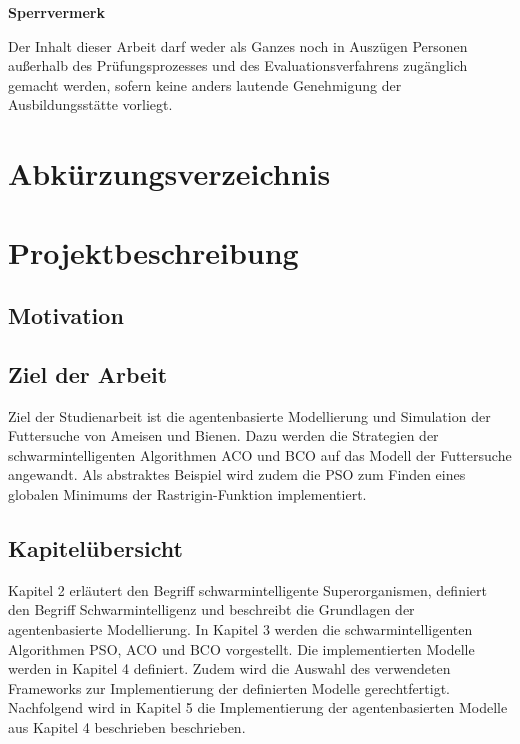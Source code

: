 \documentclass[a4paper, 11pt]{article}
\makeatletter
\newcommand*{\maintoc}{
	\begingroup
	\@fileswfalse
	\renewcommand*{\appendixattoc}{
		\value{tocdepth}=-10000
	}
	\tableofcontents
	\endgroup
}
\newcommand*{\appendixattoc}{
}
\makeatother
\begin{document}
\newpage
\begin{framed}
	\begin{center}
		\Large\bfseries Sperrvermerk
	\end{center}
	\medskip
	\noindent
	Der Inhalt dieser Arbeit darf weder als Ganzes noch in Auszügen Personen
	außerhalb des Prüfungsprozesses und des Evaluationsverfahrens zugänglich gemacht
	werden, sofern keine anders lautende Genehmigung der Ausbildungsstätte vorliegt.
\end{framed}
\newpage
{}
\renewcommand{\abstractname}{Zusammenfassung}
\begin{abstract}
\end{abstract}
\newpage
\maintoc           %
\newpage
\listoffigures             %
\newpage
\listoftables              %
\newpage
\section*{\Large \textbf Abkürzungsverzeichnis}  
\begin{acronym}[Bash]
\end{acronym}
\newpage
{} 
\section{Projektbeschreibung}
\subsection{Motivation}
\subsection{Ziel der Arbeit}
Ziel der Studienarbeit ist die agentenbasierte Modellierung und Simulation der Futtersuche von Ameisen und Bienen. Dazu werden die Strategien der schwarmintelligenten Algorithmen \acs{ACO} und \acs{BCO} auf das Modell der Futtersuche angewandt. Als abstraktes Beispiel wird zudem die \acs{PSO} zum Finden eines globalen Minimums der Rastrigin-Funktion implementiert.
\subsection{Kapitelübersicht}
Kapitel 2 erläutert den Begriff schwarmintelligente Superorganismen, definiert den Begriff Schwarmintelligenz und beschreibt die Grundlagen der agentenbasierte Modellierung. In Kapitel 3 werden die schwarmintelligenten Algorithmen \acs{PSO}, \acs{ACO} und \acs{BCO} vorgestellt. Die implementierten Modelle werden in Kapitel 4 definiert. Zudem wird die Auswahl des verwendeten Frameworks zur Implementierung der definierten Modelle gerechtfertigt. Nachfolgend wird in Kapitel 5 die Implementierung der agentenbasierten Modelle aus Kapitel 4 beschrieben beschrieben.
\newpage
\end{document}
